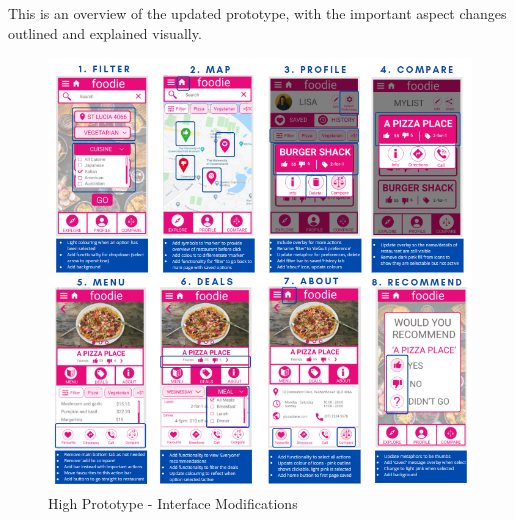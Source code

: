 \documentclass[a4 paper, 12pt]{article}
\begin{document}
    This is an overview of the updated prototype, with the important aspect changes outlined and explained visually. 
    \begin{figure} [H]
        \centering
        \includegraphics[width=\textwidth, frame]
            {./High_Fidelity/High_Report/images/high_proto_notes.PNG}  
        \caption{High Prototype - Interface Modifications}
    \end{figure}  
\end{document}
